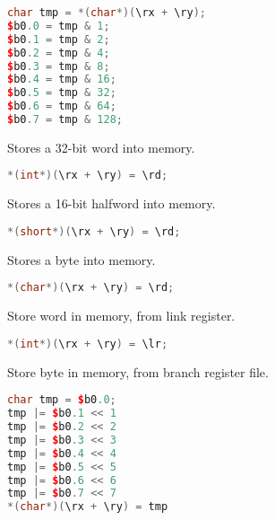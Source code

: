 \begin{lstlisting}[numbers=none, basicstyle=\ttfamily\footnotesize, language=C++]
char tmp = *(char*)(\rx + \ry);
$b0.0 = tmp & 1;
$b0.1 = tmp & 2;
$b0.2 = tmp & 4;
$b0.3 = tmp & 8;
$b0.4 = tmp & 16;
$b0.5 = tmp & 32;
$b0.6 = tmp & 64;
$b0.7 = tmp & 128;
\end{lstlisting}

Stores a 32-bit word into memory.

\begin{lstlisting}[numbers=none, basicstyle=\ttfamily\footnotesize, language=C++]
*(int*)(\rx + \ry) = \rd;
\end{lstlisting}

Stores a 16-bit halfword into memory.

\begin{lstlisting}[numbers=none, basicstyle=\ttfamily\footnotesize, language=C++]
*(short*)(\rx + \ry) = \rd;
\end{lstlisting}

Stores a byte into memory.

\begin{lstlisting}[numbers=none, basicstyle=\ttfamily\footnotesize, language=C++]
*(char*)(\rx + \ry) = \rd;
\end{lstlisting}

Store word in memory, from link register.

\begin{lstlisting}[numbers=none, basicstyle=\ttfamily\footnotesize, language=C++]
*(int*)(\rx + \ry) = \lr;
\end{lstlisting}

Store byte in memory, from branch register file.

\begin{lstlisting}[numbers=none, basicstyle=\ttfamily\footnotesize, language=C++]
char tmp = $b0.0;
tmp |= $b0.1 << 1
tmp |= $b0.2 << 2
tmp |= $b0.3 << 3
tmp |= $b0.4 << 4
tmp |= $b0.5 << 5
tmp |= $b0.6 << 6
tmp |= $b0.7 << 7
*(char*)(\rx + \ry) = tmp
\end{lstlisting}
